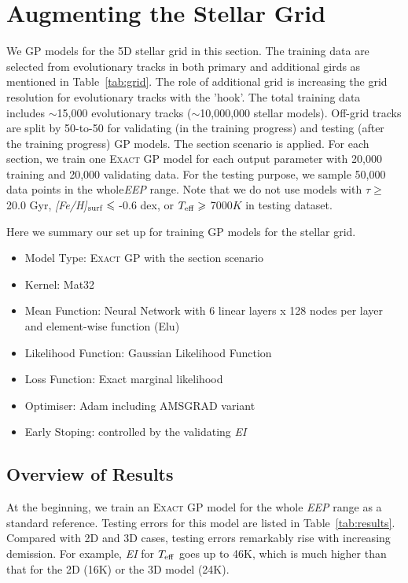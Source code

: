\section{Augmenting the Stellar Grid}\label{sec:results}

We GP models for the 5D stellar grid in this section. The training data are selected from evolutionary tracks in both primary and additional girds as mentioned in Table~\ref{tab:grid}. The role of additional grid is increasing the grid resolution for evolutionary tracks with the 'hook'. 
The total training data includes $\sim$15,000 evolutionary tracks ($\sim$10,000,000 stellar models). Off-grid tracks are split by 50-to-50 for validating (in the training progress) and testing (after the training progress) GP models.
The section scenario is applied. For each section, we train one \textsc{Exact} GP model for each output parameter with 20,000 training and 20,000 validating data. For the testing purpose, we sample 50,000 data points in the whole{\it EEP} range. Note that we do not use models with $\tau \geq$ 20.0 Gyr, {\it [Fe/H]}$_{\rm surf} \leq$ -0.6 dex, or $T_{\rm eff} \geq$ 7000$K$ in testing dataset. 

Here we summary our set up for training GP models for the stellar grid.
\begin{itemize}
\item Model Type: \textsc{Exact GP} with the section scenario 
\item Kernel: Mat32 %
\item Mean Function: Neural Network with 6 linear layers x 128 nodes per layer and element-wise function (Elu) 
\item Likelihood Function: Gaussian Likelihood Function
\item Loss Function: Exact marginal likelihood
\item Optimiser: Adam including AMSGRAD variant
\item Early Stoping: controlled by the validating {\it EI}
\end{itemize}

\subsection{Overview of Results}

At the beginning, we train an \textsc{Exact GP} model for the whole {\it EEP} range as a standard reference. Testing errors for this model are listed in Table~\ref{tab:results}. Compared with 2D and 3D cases, testing errors remarkably rise with increasing demission. For example, {\it EI} for $T_{\rm eff}$ goes up to 46K, which is much higher than that for the 2D (16K) or the 3D model (24K). 

